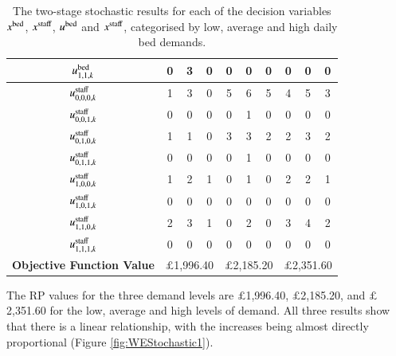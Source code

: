 \documentclass[../thesis.tex]{subfiles}
\begin{document}
\begin{landscape}
\begin{table}[h!]
{\begin{tabular}{cccccccccc}
    $u^\textnormal{bed}_{1,1,k}$     & 0 & 3  & 0  &  0 &  0 & 0  & 0  &  0 & 0  \\ \midrule
    $u^\textnormal{staff}_{0,0,0,k}$ & 1 & 3 & 0 & 5 &6  & 5 &4  & 5  & 3  \\
    $u^\textnormal{staff}_{0,0,1,k}$ & 0 & 0 & 0 & 0 & 1  & 0 &  0 & 0  &  0 \\
    $u^\textnormal{staff}_{0,1,0,k}$ & 1 & 1 & 0 & 3 &  3 & 2 &  2 & 3 &   2 \\
    $u^\textnormal{staff}_{0,1,1,k}$ & 0 & 0 & 0 & 0 &  1 & 0 &  0 & 0  & 0  \\
    $u^\textnormal{staff}_{1,0,0,k}$ & 1 & 2 & 1 & 0 & 1 & 0 & 2  & 2  &  1 \\
    $u^\textnormal{staff}_{1,0,1,k}$ & 0 & 0 & 0 & 0 & 0 & 0 & 0 &  0 &   0 \\
    $u^\textnormal{staff}_{1,1,0,k}$ & 2 & 3 & 1 & 0 & 2  & 0 & 3  & 4  & 2  \\
    $u^\textnormal{staff}_{1,1,1,k}$ & 0 & 0 & 0 & 0  &  0 & 0 &  0 &  0 &  0 \\ \midrule
     \textbf{Objective Function Value} &\multicolumn{3}{c}{$\pounds$1,996.40} & \multicolumn{3}{c}{$\pounds$2,185.20}& \multicolumn{3}{c}{$\pounds$2,351.60}\\\bottomrule
    \end{tabular}}
    \caption{The two-stage stochastic results for each of the decision variables $x^{\textnormal{bed}}$, $x^{\textnormal{staff}}$, $u^{\textnormal{bed}}$ and $x^{\textnormal{staff}}$, categorised by low, average and high daily bed demands.}
    \label{tab:WEStochResults}
\end{table}

\end{landscape}

The RP values for the three demand levels are $\pounds$1,996.40, $\pounds$2,185.20, and $\pounds$2,351.60 for the low, average and high levels of demand. All three results show that there is a linear relationship, with the increases being almost directly proportional (Figure \ref{fig:WEStochastic1}).
\end{document}
